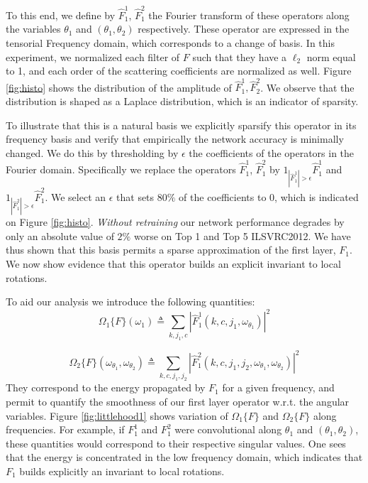 \documentclass[10pt,twocolumn,letterpaper]{article}
\begin{document}
To this end, we define by $\hat F_1^1$, $\hat F_1^2$ the Fourier transform of these operators along the variables $\theta_1$ and $(\theta_1,\theta_2)$ respectively. These operator are expressed in the tensorial Frequency domain, which corresponds to a change of basis. In this experiment, we normalized each filter of $F$ such that they have a $\ell_2$ norm equal to 1, and each order of the scattering coefficients are normalized as well. Figure \ref{fig:histo} shows the distribution of the amplitude of $\hat F_1^1,\hat F_2^2$. We observe that the distribution is shaped as a Laplace distribution, which is an indicator of sparsity. 

To illustrate that this is a natural basis we explicitly sparsify this operator in its frequency basis and verify that empirically the network accuracy is minimally changed. We do this by thresholding  by $\epsilon$ the coefficients of the operators in the Fourier domain. Specifically we replace the operators $\hat F_1^1$, $\hat F_1^2$ by $1_{|\hat F_1^1|>\epsilon}\hat F_1^1$ and $1_{|\hat F_1^2|>\epsilon}\hat F_1^2$. We select an $\epsilon$ that sets $80\%$ of the coefficients to 0, which is indicated on Figure \ref{fig:histo}. \textit{Without retraining} our network performance degrades by only an absolute value of $2\%$ worse on Top 1 and Top 5 ILSVRC2012. We have thus shown that this basis permits a sparse approximation of the first layer, $F_1$. We now show evidence that this operator builds an explicit invariant to local rotations.

To aid our analysis we introduce the following quantities:
\setlength{\belowdisplayskip}{0pt} \setlength{\belowdisplayshortskip}{0pt}
\setlength{\abovedisplayskip}{0pt} \setlength{\abovedisplayshortskip}{0pt}
\begin{equation}
\Omega_1\{F\}(\omega_1)\triangleq\sum_{k,j_1,c}|\hat{F}^1_1(k,c,j_1,\omega_{\theta_1})|^2
\label{eq1}
\end{equation}

\begin{equation*}
\Omega_2\{F\}(\omega_{\theta_1},\omega_{\theta_2})\triangleq\sum_{k,c,j_1,j_2}|\hat{F}^2_1(k,c,j_1,j_2,\omega_{\theta_1},\omega_{\theta_2})|^2
\end{equation*}
They correspond to the energy propagated by $F_1$ for a given frequency, and permit to quantify the smoothness of our first layer operator w.r.t. the angular variables. Figure \ref{fig:littlehood1} shows variation of  $\Omega_1\{F\}$ and $\Omega_2\{F\}$ along frequencies. For example, if $F_1^1$ and $F_1^2$ were convolutional along $\theta_1$ and $(\theta_1,\theta_2)$, these quantities would correspond to their respective singular values. One sees that the energy is concentrated in the low frequency domain, which indicates that $F_1$ builds explicitly an invariant to local rotations.
\end{document}
